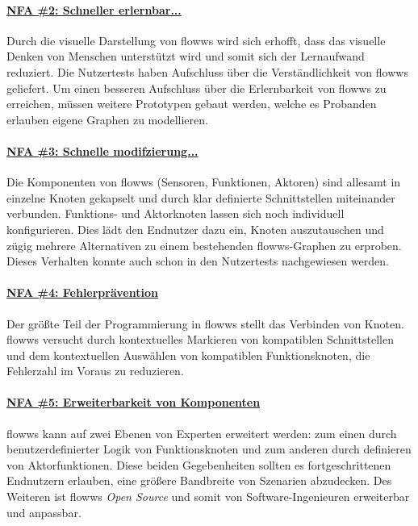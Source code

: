 \paragraph{\hyperref[tab:NFA2]{NFA \#2: Schneller erlernbar...}} Durch die visuelle Darstellung von flowws wird sich erhofft, dass das visuelle Denken von Menschen unterstützt wird und somit sich der Lernaufwand reduziert. Die Nutzertests haben Aufschluss über die Verständlichkeit von flowws geliefert. Um einen besseren Aufschluss über die Erlernbarkeit von flowws zu erreichen, müssen weitere Prototypen gebaut werden, welche es Probanden erlauben eigene Graphen zu modellieren.

\paragraph{\hyperref[tab:NFA3]{NFA \#3: Schnelle modifzierung...}} Die Komponenten von flowws (Sensoren, Funktionen, Aktoren) sind allesamt in einzelne Knoten gekapselt und durch klar definierte Schnittstellen miteinander verbunden. Funktions- und Aktorknoten lassen sich noch individuell konfigurieren. Dies lädt den Endnutzer dazu ein, Knoten auszutauschen und zügig mehrere Alternativen zu einem bestehenden flowws-Graphen zu erproben. Dieses Verhalten konnte auch schon in den Nutzertests nachgewiesen werden.

\paragraph{\hyperref[tab:NFA4]{NFA \#4: Fehlerprävention}} Der größte Teil der Programmierung in flowws stellt das Verbinden von Knoten. flowws versucht durch kontextuelles Markieren von kompatiblen Schnittstellen und dem kontextuellen Auswählen von kompatiblen Funktionsknoten, die Fehlerzahl im Voraus zu reduzieren. 

\paragraph{\hyperref[tab:NFA5]{NFA \#5: Erweiterbarkeit von Komponenten}} flowws kann auf zwei Ebenen von Experten erweitert werden: zum einen durch benutzerdefinierter Logik von Funktionsknoten und zum anderen durch definieren von Aktorfunktionen. Diese beiden Gegebenheiten sollten es fortgeschrittenen Endnutzern erlauben, eine größere Bandbreite von Szenarien abzudecken. Des Weiteren ist flowws \textit{Open Source} und somit von Software-Ingenieuren erweiterbar und anpassbar.

